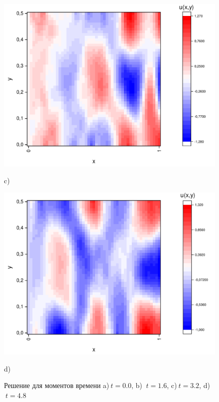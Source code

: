 \documentclass[a4paper,12pt]{article}
\begin{document}
\begin{figure}[h!]
\begin{center}
\begin{minipage}[h]{0.23\linewidth}
		\end{minipage}
		\begin{minipage}[h]{0.23\linewidth}
			\includegraphics[width=\textwidth]{graphs/graphs_a/v1/wave_t-16_v1.pdf} \begin{center}	c)	\end{center}
		\end{minipage}
		\begin{minipage}[h]{0.23\linewidth}
			\includegraphics[width=\textwidth]{graphs/graphs_a/v1/wave_t-24_v1.pdf} \begin{center}	d)	\end{center}
		\end{minipage}
	\end{center}
	\caption{Решение для моментов времени a)$\ t = 0.0$, b) $\ t = 1.6$, c)$\ t = 3.2$, d)$\ t = 4.8$}
\end{figure}
\end{document}
